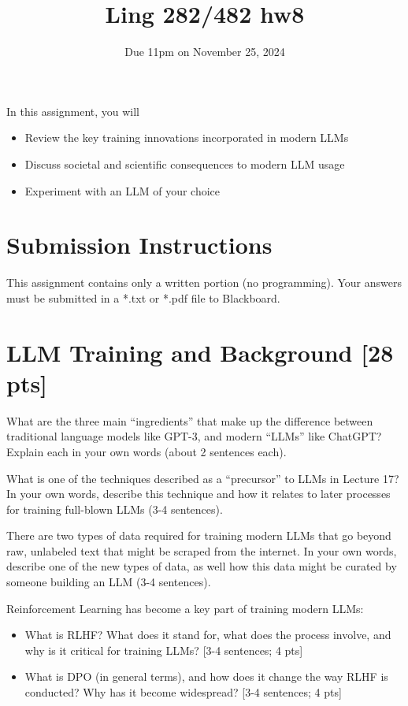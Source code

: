 \documentclass[11pt]{article}
\begin{document}
\title{Ling 282/482 hw8}
\date{\vspace{-0.2in}Due 11pm on November 25, 2024}
\maketitle


\noindent In this assignment, you will 
\begin{itemize}
  \item Review the key training innovations incorporated in modern LLMs
  \item Discuss societal and scientific consequences to modern LLM usage
  \item Experiment with an LLM of your choice
\end{itemize}

\section*{Submission Instructions}
This assignment contains only a written portion (no programming). Your answers must be submitted in a *.txt or *.pdf file to Blackboard.

\section{LLM Training and Background [28 pts]}

 What are the three main ``ingredients'' that make up the difference between traditional language models like GPT-3, and modern ``LLMs'' like ChatGPT? Explain each in your own words (about 2 sentences each).

\vspace{2em}
 What is one of the techniques described as a ``precursor'' to LLMs in Lecture 17? In your own words, describe this technique and how it relates to later processes for training full-blown LLMs (3-4 sentences).

\vspace{2em}
 There are two types of data required for training modern LLMs that go beyond raw, unlabeled text that might be scraped from the internet. In your own words, describe one of the new types of data, as well how this data might be curated by someone building an LLM (3-4 sentences).

\vspace{2em}
 Reinforcement Learning has become a key part of training modern LLMs:
\begin{itemize}
  \item What is RLHF? What does it stand for, what does the process involve, and why is it critical for training LLMs? [3-4 sentences; 4 pts]
  \item What is DPO (in general terms), and how does it change the way RLHF is conducted? Why has it become widespread? [3-4 sentences; 4 pts]
\end{itemize}
\end{document}
